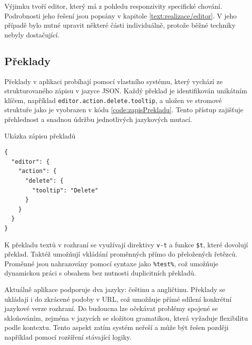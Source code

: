 Výjimku tvoří editor, který má z pohledu responzivity specifické chování. 
Podrobnosti jeho řešení jsou popsány v kapitole \ref{text:realizace/editor}. 
V jeho případě bylo nutné upravit některé části individuálně, protože běžné techniky nebyly dostačující.



\subsection{Překlady}

Překlady v aplikaci probíhají pomocí vlastního systému, který vychází ze strukturovaného zápisu v jazyce JSON. 
Každý překlad je identifikován unikátním klíčem, například \texttt{editor.action.delete.tooltip}, a uložen ve stromové struktuře jako je vyobrazen v kódu \ref{code:zapisPrekladu}.
Tento přístup zajišťuje přehlednost a snadnou údržbu jednotlivých jazykových mutací.


\begin{listing}[ht!]
\caption{Ukázka zápisu překladů}\label{code:zapisPrekladu}
\begin{verbatim}
{
  "editor": {
    "action": {
      "delete": {
        "tooltip": "Delete"
      }
    }
  }
}
\end{verbatim}
\end{listing}

K překladu textů v rozhraní se využívají direktivy \texttt{v-t} a funkce \texttt{\$t}, které dovolují překlad.
Taktéž umožňují vkládání proměnných přímo do přeložených řetězců. 
Proměnné jsou nahrazovány pomocí syntaxe jako \texttt{\%test\%}, což umožňuje dynamickou práci s obsahem bez nutnosti duplicitních překladů.

Aktuálně aplikace podporuje dva jazyky: češtinu a angličtinu. 
Překlady se ukládají i do zkrácené podoby v URL, což umožňuje přímé sdílení konkrétní jazykové verze rozhraní. 
Do budoucna lze očekávat problémy spojené se skloňováním, zejména v jazycích se složitou gramatikou, která vyžaduje flexibilitu podle kontextu. 
Tento aspekt zatím systém neřeší a může být řešen později například pomocí rozšíření stávající logiky.


